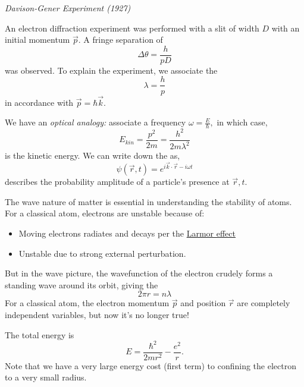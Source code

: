 \documentclass{article}
\numberwithin{equation}{section}
\begin{document}
\begin{experiment}
    \textit{Davison-Gener Experiment (1927)}

    An electron diffraction experiment was performed with a slit of width $D$ with an initial momentum $\vec{p}.$ A fringe separation of
    \begin{equation*}
        \Delta \theta = \frac{h}{pD}
    \end{equation*}
    was observed. To explain the experiment, we associate the  
    \begin{equation*}
        \lambda = \frac{h}{p}
    \end{equation*}
    in accordance with $\vec{p}=\hbar\vec{k}.$
\end{experiment}
We have an \textit{optical analogy:} associate a frequency $\omega = \frac{E}{\hbar},$ in which case,
\begin{equation*}
    E_{kin} = \frac{p^2}{2m} = \frac{h^2}{2m\lambda^2}
\end{equation*}
is the kinetic energy. We can write down the  as,
\begin{equation*}
    \psi(\vec{r},t) = e^{i\vec{k}\cdot\vec{r} - i\omega t}
\end{equation*}
describes the probability amplitude of a particle's presence at $\vec{r},t.$

The wave nature of matter is essential in understanding the stability of atoms. For a classical atom, electrons are unstable because of:
\begin{itemize}
    \item Moving electrons radiates and decays per the \href{https://en.wikipedia.org/wiki/Larmor_formula}{Larmor effect}
    \item Unstable due to strong external perturbation.
\end{itemize}
But in the wave picture, the wavefunction of the electron crudely forms a standing wave around its orbit, giving the 
\begin{equation*}
    2\pi r = n\lambda
\end{equation*}
For a classical atom, the electron momentum $\vec{p}$ and position $\vec{r}$ are completely independent variables, but now it's no longer true!

The total energy is 
\begin{equation*}
    E = \frac{\hbar^2}{2mr^2} - \frac{e^2}{r}.
\end{equation*}
Note that we have a very large energy cost (first term) to confining the electron to a very small radius.
\end{document}
